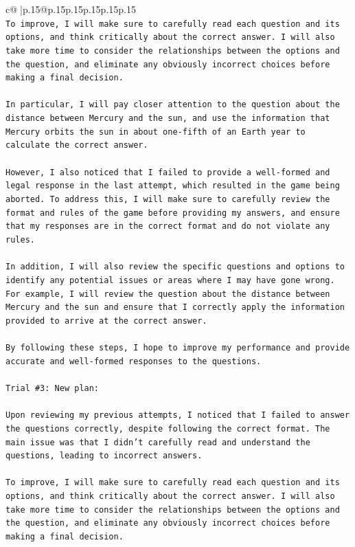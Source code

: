 \documentclass{article}
\begin{document}
{\begin{supertabular}{c@{$\;$}|p{.15\linewidth}@{}p{.15\linewidth}p{.15\linewidth}p{.15\linewidth}p{.15\linewidth}p{.15\linewidth}}
{{{\\ 
\texttt{To improve, I will make sure to carefully read each question and its options, and think critically about the correct answer. I will also take more time to consider the relationships between the options and the question, and eliminate any obviously incorrect choices before making a final decision. } \\
\\ 
\texttt{In particular, I will pay closer attention to the question about the distance between Mercury and the sun, and use the information that Mercury orbits the sun in about one{-}fifth of an Earth year to calculate the correct answer.} \\
\\ 
\texttt{However, I also noticed that I failed to provide a well{-}formed and legal response in the last attempt, which resulted in the game being aborted. To address this, I will make sure to carefully review the format and rules of the game before providing my answers, and ensure that my responses are in the correct format and do not violate any rules.} \\
\\ 
\texttt{In addition, I will also review the specific questions and options to identify any potential issues or areas where I may have gone wrong. For example, I will review the question about the distance between Mercury and the sun and ensure that I correctly apply the information provided to arrive at the correct answer.} \\
\\ 
\texttt{By following these steps, I hope to improve my performance and provide accurate and well{-}formed responses to the questions.} \\
\\ 
\texttt{Trial \#3: New plan: } \\
\\ 
\texttt{Upon reviewing my previous attempts, I noticed that I failed to answer the questions correctly, despite following the correct format. The main issue was that I didn't carefully read and understand the questions, leading to incorrect answers. } \\
\\ 
\texttt{To improve, I will make sure to carefully read each question and its options, and think critically about the correct answer. I will also take more time to consider the relationships between the options and the question, and eliminate any obviously incorrect choices before making a final decision. } \\
}}}
\end{supertabular}}
\end{document}
